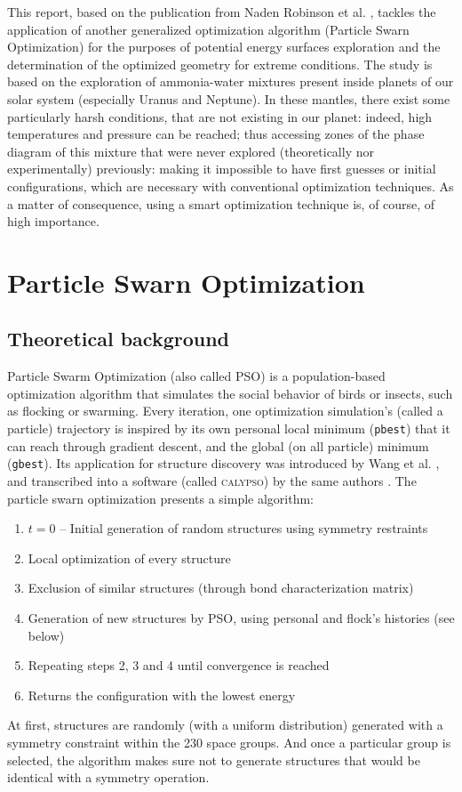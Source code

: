 \documentclass[11pt]{article}
\begin{document}
\begin{multicols}{2}
This report, based on the publication from Naden Robinson et al. \cite{original}, tackles the application of another generalized optimization algorithm (Particle Swarn Optimization) for the purposes of potential energy surfaces exploration and the determination of the optimized geometry for extreme conditions. The study is based on the exploration of ammonia-water mixtures present inside planets of our solar system (especially Uranus and Neptune). In these mantles, there exist some particularly harsh conditions, that are not existing in our planet: indeed, high temperatures and pressure can be reached; thus accessing zones of the phase diagram of this mixture that were never explored (theoretically nor experimentally) previously: making it impossible to have first guesses or initial configurations, which are necessary with conventional optimization techniques. As a matter of consequence, using a smart optimization technique is, of course, of high importance.

\section*{Particle Swarn Optimization}
\subsection*{Theoretical background}
Particle Swarm Optimization (also called PSO) is a population-based optimization algorithm that simulates the social behavior of birds or insects, such as flocking or swarming. Every iteration, one optimization simulation's (called a particle) trajectory is inspired by its own personal local minimum (\verb+pbest+) that it can reach through gradient descent, and the global (on all particle) minimum (\verb+gbest+). Its application for structure discovery was introduced by Wang et al. \cite{PhysRevB.82.094116}, and transcribed into a software (called \textsc{calypso}) by the same authors \cite{WANG20122063}. The particle swarn optimization presents a simple algorithm:
\begin{enumerate}
\itemsep0em
    \item $t=0$ -- Initial generation of random structures using symmetry restraints
    \item Local optimization of every structure
    \item Exclusion of similar structures (through bond characterization matrix)
    \item Generation of new structures by PSO, using personal and flock's histories (see below)
    \item Repeating steps 2, 3 and 4 until convergence is reached
    \item Returns the configuration with the lowest energy
\end{enumerate}
At first, structures are randomly (with a uniform distribution) generated with a symmetry constraint within the 230 space groups. And once a particular group is selected, the algorithm makes sure not to generate structures that would be identical with a symmetry operation.


\end{multicols}
\end{document}
